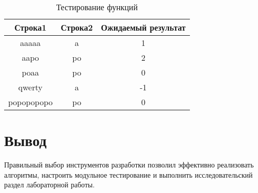 \begin{table}[h!]
	\begin{center}
		\begin{tabular}{|c|c|c|}
			\hline
			\textbf{Строка1} & \textbf{Строка2} & \textbf{Ожидаемый результат} \\ \hline
			aaaaa      & a  & 1  \\ \hline
			aapo       & po & 2  \\ \hline
			poaa       & po & 0  \\ \hline
			qwerty     & a  & -1 \\ \hline
			popopopopo & po & 0  \\ \hline
		\end{tabular}
		\caption{Тестирование функций}
		\label{tbl:test}
	\end{center}
\end{table}

\section*{Вывод}

Правильный выбор инструментов разработки позволил эффективно реализовать алгоритмы, настроить модульное тестирование и выполнить исследовательский раздел лабораторной работы.
